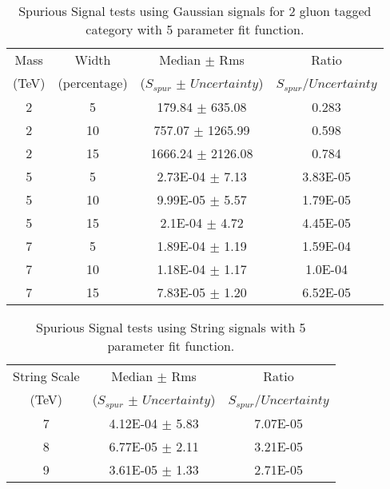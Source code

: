 \begin{table}[ht]
\begin{center}
\begin{tabular}{|c|c|c|c|}
\hline
Mass & Width & Median $\pm$ Rms & Ratio \\
(TeV)  & (percentage) & ($S_{spur}$ $\pm$ $Uncertainty$) & $S_{spur}$/$Uncertainty$ \\
\hline
2  & 5 & 179.84 $\pm$ 635.08 & 0.283 \\
2  & 10 & 757.07 $\pm$ 1265.99 & 0.598 \\
2  & 15 & 1666.24 $\pm$ 2126.08 & 0.784 \\
5  & 5 & 2.73E-04 $\pm$ 7.13 & 3.83E-05 \\
5  & 10 & 9.99E-05 $\pm$ 5.57 & 1.79E-05 \\
5  & 15 & 2.1E-04 $\pm$ 4.72 & 4.45E-05 \\
7  & 5 & 1.89E-04 $\pm$ 1.19 & 1.59E-04 \\
7  & 10 & 1.18E-04 $\pm$ 1.17 & 1.0E-04 \\
7  & 15 & 7.83E-05 $\pm$ 1.20 & 6.52E-05 \\
\hline
\end{tabular}
\end{center}
\caption{Spurious Signal tests using Gaussian signals for 2 gluon tagged category with 5 parameter fit function.}
\label{tab:Sspur_Gauss_2gtag_5par}
\end{table}%

\begin{table}[ht]
\begin{center}
\begin{tabular}{|c|c|c|}
\hline
String Scale & Median $\pm$ Rms & Ratio \\
(TeV)  & ($S_{spur}$ $\pm$ $Uncertainty$) & $S_{spur}$/$Uncertainty$ \\
\hline
7  & 4.12E-04 $\pm$ 5.83 & 7.07E-05 \\
8  & 6.77E-05 $\pm$ 2.11 & 3.21E-05 \\
9  & 3.61E-05 $\pm$ 1.33 & 2.71E-05 \\
\hline
\end{tabular}
\end{center}
\caption{Spurious Signal tests using String signals with 5 parameter fit function.}
\label{tab:Sspur_String_1gtag_5par}
\end{table}%


